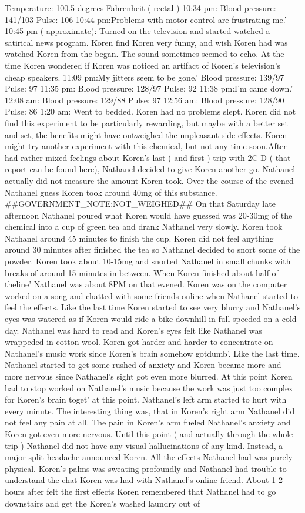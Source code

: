 \documentclass[12pt]{book}
\begin{document}
Temperature: 100.5 degrees Fahrenheit ( rectal ) 10:34 pm: Blood pressure: 141/103 Pulse: 106 10:44 pm:Problems with motor control are frustrating me.' 10:45 pm ( approximate): Turned on the television and started watched a satirical news program. Koren find Koren very funny, and wish Koren had was watched Koren from the began. The sound sometimes seemed to echo. At the time Koren wondered if Koren was noticed an artifact of Koren's television's cheap speakers. 11:09 pm:My jitters seem to be gone.' Blood pressure: 139/97 Pulse: 97 11:35 pm: Blood pressure: 128/97 Pulse: 92 11:38 pm:I'm came down.' 12:08 am: Blood pressure: 129/88 Pulse: 97 12:56 am: Blood pressure: 128/90 Pulse: 86 1:20 am: Went to bedded. Koren had no problems slept. Koren did not find this experiment to be particularly rewarding, but maybe with a better set and set, the benefits might have outweighed the unpleasant side effects. Koren might try another experiment with this chemical, but not any time soon.After had rather mixed feelings about Koren's last ( and first ) trip with 2C-D ( that report can be found here), Nathanel decided to give Koren another go. Nathanel actually did not measure the amount Koren took. Over the course of the evened Nathanel guess Koren took around 40mg of this substance. \#\#GOVERNMENT\_NOTE:NOT\_WEIGHED\#\# On that Saturday late afternoon Nathanel poured what Koren would have guessed was 20-30mg of the chemical into a cup of green tea and drank Nathanel very slowly. Koren took Nathanel around 45 minutes to finish the cup. Koren did not feel anything around 30 minutes after finished the tea so Nathanel decided to snort some of the powder. Koren took about 10-15mg and snorted Nathanel in small chunks with breaks of around 15 minutes in between. When Koren finished about half of theline' Nathanel was about 8PM on that evened. Koren was on the computer worked on a song and chatted with some friends online when Nathanel started to feel the effects. Like the last time Koren started to see very blurry and Nathanel's eyes was watered as if Koren would ride a bike downhill in full speeded on a cold day. Nathanel was hard to read and Koren's eyes felt like Nathanel was wrappeded in cotton wool. Koren got harder and harder to concentrate on Nathanel's music work since Koren's brain somehow gotdumb'. Like the last time. Nathanel started to get some rushed of anxiety and Koren became more and more nervous since Nathanel's sight got even more blurred. At this point Koren had to stop worked on Nathanel's music because the work was just too complex for Koren's brain toget' at this point. Nathanel's left arm started to hurt with every minute. The interesting thing was, that in Koren's right arm Nathanel did not feel any pain at all. The pain in Koren's arm fueled Nathanel's anxiety and Koren got even more nervous. Until this point ( and actually through the whole trip ) Nathanel did not have any visual hallucinations of any kind. Instead, a major split headache announced Koren. All the effects Nathanel had was purely physical. Koren's palms was sweating profoundly and Nathanel had trouble to understand the chat Koren was had with Nathanel's online friend. About 1-2 hours after felt the first effects Koren remembered that Nathanel had to go downstairs and get the Koren's washed laundry out of 
\end{document}
